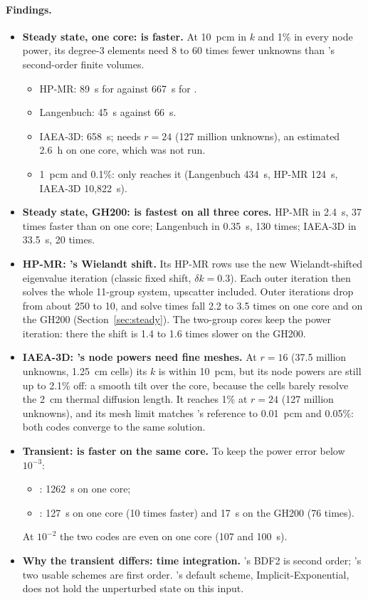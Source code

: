 \paragraph{Findings.}
\begin{itemize}
\item \textbf{Steady state, one core: \ffn{} is faster.} At 10~pcm in $k$
  and 1\% in every node power, its degree-3 elements need 8 to 60 times
  fewer unknowns than \garnet's second-order finite volumes.
  \begin{itemize}
  \item HP-MR: 89~s for \ffn{} against 667~s for \garnet.
  \item Langenbuch: 45~s against 66~s.
  \item IAEA-3D: 658~s; \garnet{} needs $r=24$ (127 million unknowns), an
    estimated 2.6~h on one core, which was not run.
  \item 1~pcm and 0.1\%: only \ffn{} reaches it (Langenbuch 434~s,
    HP-MR 124~s, IAEA-3D 10,822~s).
  \end{itemize}
\item \textbf{Steady state, GH200: \garnet{} is fastest on all three
  cores.} HP-MR in 2.4~s, 37 times faster than \ffn{} on one core;
  Langenbuch in 0.35~s, 130 times; IAEA-3D in 33.5~s, 20 times.
\item \textbf{HP-MR: \garnet's Wielandt shift.} Its HP-MR rows use the new
  Wielandt-shifted eigenvalue iteration (classic fixed shift,
  $\delta k = 0.3$). Each outer iteration then solves the whole 11-group
  system, upscatter included. Outer iterations drop from about 250 to 10,
  and solve times fall 2.2 to 3.5 times on one core and on the GH200
  (Section~\ref{sec:steady}). The two-group cores keep the power
  iteration: there the shift is 1.4 to 1.6 times slower on the GH200.
\item \textbf{IAEA-3D: \garnet's node powers need fine meshes.} At $r=16$
  (37.5 million unknowns, 1.25~cm cells) its $k$ is within 10~pcm, but its
  node powers are still up to 2.1\% off: a smooth tilt over the core,
  because the cells barely resolve the 2~cm thermal diffusion length. It
  reaches 1\% at $r=24$ (127 million unknowns), and its mesh limit matches
  \ffn's reference to 0.01~pcm and 0.05\%: both codes converge to the same
  solution.
\item \textbf{Transient: \garnet{} is faster on the same core.} To keep the
  power error below $10^{-3}$:
  \begin{itemize}
  \item \ffn{}: 1262~s on one core;
  \item \garnet{}: 127~s on one core (10 times faster) and 17~s on the
    GH200 (76 times).
  \end{itemize}
  At $10^{-2}$ the two codes are even on one core (107 and 100~s).
\item \textbf{Why the transient differs: time integration.} \garnet's BDF2
  is second order; \ffn's two usable schemes are first order. \ffn's default
  scheme, Implicit-Exponential, does not hold the unperturbed state on this
  input.
\end{itemize}

